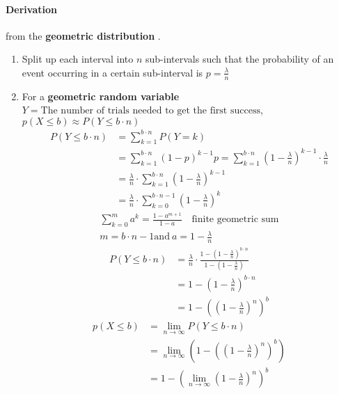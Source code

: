 \documentclass[12pt]{article}
\theoremstyle{plain}
\theoremstyle{definition}
\theoremstyle{remark}
\begin{document}
\paragraph{Derivation} from the \textbf{geometric distribution} \citep{hol18}.
\begin{enumerate}
\item Split up each interval into $n$ sub-intervals such that the probability
  of an event occurring in a certain sub-interval is $p = \frac{\lambda}{n}$
\item For a \textbf{geometric random variable}
  $Y = \text{The number of trials needed to get the first success}$,
  $p(X \leq b) \approx P(Y \leq b \cdot n)$
\begin{align*}
  P(Y \leq b \cdot n) & = \sum_{k=1}^{b \cdot n}P(Y=k) \\
                      & = \sum_{k=1}^{b \cdot n}(1-p)^{k-1}p =
                        \sum_{k=1}^{b \cdot n}\left(1-\frac{\lambda}{n}\right)^{k-1}
                        \cdot \frac{\lambda}{n} \\
                      & = \frac{\lambda}{n} \cdot \sum_{k=1}^{b \cdot n}
                        \left(1-\frac{\lambda}{n}\right)^{k-1} \\
                      & = \frac{\lambda}{n} \cdot \sum_{k=0}^{b \cdot n - 1}
                        \left(1-\frac{\lambda}{n}\right)^{k}
\end{align*}
\begin{align*}
  \sum_{k=0}^{m}a^k = \frac{1-a^{m+1}}{1-a}\quad
  \text{finite geometric sum} \\
  m = b \cdot n - 1 \text{and}\ a = 1 - \frac{\lambda}{n}
\end{align*}
\begin{align*}
  P(Y \leq b \cdot n) & =
                        \frac{\lambda}{n} \cdot
                        \frac{1-\left(1-\frac{\lambda}{n}\right)^{b \cdot n}}{1-\left(1-\frac{\lambda}{n}\right)} \\
  & = 1 - \left(1-\frac{\lambda}{n}\right)^{b \cdot n} \\
                      & = 1 - \left(\left(1-\frac{\lambda}{n}\right)^n\right)^b
\end{align*}
\begin{align*}
  p(X \leq b) & = \lim_{n \to \infty} P(Y \leq b \cdot n) \\
              & =
  \lim_{n \to \infty}\left(1 - \left(\left(1-\frac{\lambda}{n}\right)^n\right)^b\right) \\
              & = 1 -
  \left(\lim_{n \to \infty}\left(1-\frac{\lambda}{n}\right)^n\right)^b \\

\end{align*}
\end{enumerate}
\end{document}
